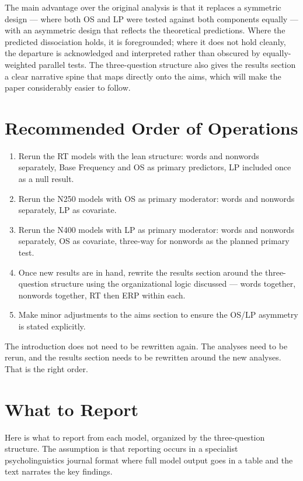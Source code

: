 \documentclass[12pt]{article}
\begin{document}
	The main advantage over the original analysis is that it replaces a symmetric design --- where both OS and LP were tested against both components equally --- with an asymmetric design that reflects the theoretical predictions. Where the predicted dissociation holds, it is foregrounded; where it does not hold cleanly, the departure is acknowledged and interpreted rather than obscured by equally-weighted parallel tests. The three-question structure also gives the results section a clear narrative spine that maps directly onto the aims, which will make the paper considerably easier to follow.
	
	\section{Recommended Order of Operations}
	
	\begin{enumerate}
		\item Rerun the RT models with the lean structure: words and nonwords separately, Base Frequency and OS as primary predictors, LP included once as a null result.
		\item Rerun the N250 models with OS as primary moderator: words and nonwords separately, LP as covariate.
		\item Rerun the N400 models with LP as primary moderator: words and nonwords separately, OS as covariate, three-way for nonwords as the planned primary test.
		\item Once new results are in hand, rewrite the results section around the three-question structure using the organizational logic discussed --- words together, nonwords together, RT then ERP within each.
		\item Make minor adjustments to the aims section to ensure the OS/LP asymmetry is stated explicitly.
	\end{enumerate}
	
	The introduction does not need to be rewritten again. The analyses need to be rerun, and the results section needs to be rewritten around the new analyses. That is the right order.
	
    \section{What to Report}
	
	
	Here is what to report from each model, organized by the three-question structure. The assumption is that reporting occurs in a specialist psycholinguistics journal format where full model output goes in a table and the text narrates the key findings.
	
\end{document}
